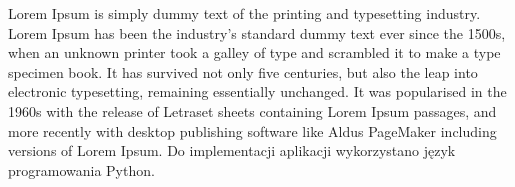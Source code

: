 \documentclass{article}
\begin{document}
Lorem Ipsum is simply dummy text of the printing and typesetting industry. Lorem Ipsum has been the industry's standard dummy text ever since the 1500s, when an unknown printer took a galley of type and scrambled it to make a type specimen book. It has survived not only five centuries, but also the leap into electronic typesetting, remaining essentially unchanged. It was popularised in the 1960s with the release of Letraset sheets containing Lorem Ipsum passages, and more recently with desktop publishing software like Aldus PageMaker including versions of Lorem Ipsum. Do implementacji aplikacji wykorzystano język programowania Python.

  
\end{document}
